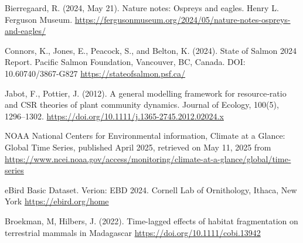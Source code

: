 \documentclass{article}
\begin{document}
\begin{thebibliography}{00}
 Bierregaard, R. (2024, May 21). Nature notes: Ospreys and eagles. Henry L. Ferguson Museum. \href{https://fergusonmuseum.org/2024/05/nature-notes-ospreys-and-eagles }{https://fergusonmuseum.org/2024/05/nature-notes-ospreys-and-eagles/}  

 Connors, K., Jones, E., Peacock, S., and Belton, K. (2024). State of Salmon 2024 Report. Pacific Salmon Foundation, Vancouver, BC, Canada. DOI: 10.60740/3867-G827 \href{https://stateofsalmon.psf.ca/}{https://stateofsalmon.psf.ca/} 

 Jabot, F., Pottier, J. (2012). A general modelling framework for resource‐ratio and CSR theories of plant community dynamics. Journal of Ecology, 100(5), 1296–1302. \href{https://doi.org/10.1111/j.1365-2745.2012.02024.x}{https://doi.org/10.1111/j.1365-2745.2012.02024.x}

 NOAA National Centers for Environmental information, Climate at a Glance: Global Time Series, published April 2025, retrieved on May 11, 2025 from \href{https://www.ncei.noaa.gov/access/monitoring/climate-at-a-glance/global/time-series}{https://www.ncei.noaa.gov/access/monitoring/climate-at-a-glance/global/time-series}

 eBird Basic Dataset. Verion: EBD 2024. Cornell Lab of Ornithology, Ithaca, New York \href{https://ebird.org/home}{https://ebird.org/home}

 Broekman, M, Hilbers, J. (2022). Time-lagged effects of habitat fragmentation on terrestrial mammals in Madagascar \href{https://doi.org/10.1111/cobi.13942}{https://doi.org/10.1111/cobi.13942}


\end{thebibliography}
\end{document}
